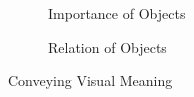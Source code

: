 \documentclass[twoside, 12pt]{article}
\begin{document}
\begin{figure}[H]
        \centering
        \begin{subfigure}[b]{0.3\textwidth}
                \caption{Importance of Objects}
                \label{fig:imp_objects}
        \end{subfigure}%
        \qquad %
        \begin{subfigure}[b]{0.3\textwidth}
                \caption{Relation of Objects}
                \label{fig:rel_objects}
        \end{subfigure}
        \caption{Conveying Visual Meaning}\label{fig:Objects}
\end{figure}
\end{document}
